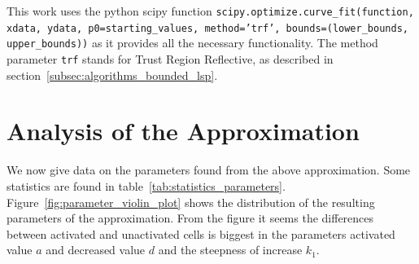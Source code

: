 This work uses the python scipy function \texttt{scipy.optimize.curve\_fit(function, xdata, ydata, p0=starting\_values, method='trf', bounds=(lower\_bounds, upper\_bounds))} as it provides all the necessary functionality. The method parameter \texttt{trf} stands for Trust Region Reflective, as described in section~\ref{subsec:algorithms_bounded_lsp}.

\section{Analysis of the Approximation}
\label{sec:analysis_of_approximation}

We now give data on the parameters found from the above approximation. Some statistics are found in table~\ref{tab:statistics_parameters}. Figure~\ref{fig:parameter_violin_plot} shows the distribution of the resulting parameters of the approximation. From the figure it seems the differences between activated and unactivated cells is biggest in the parameters activated value $a$ and decreased value $d$ and the steepness of increase $k_1$.

